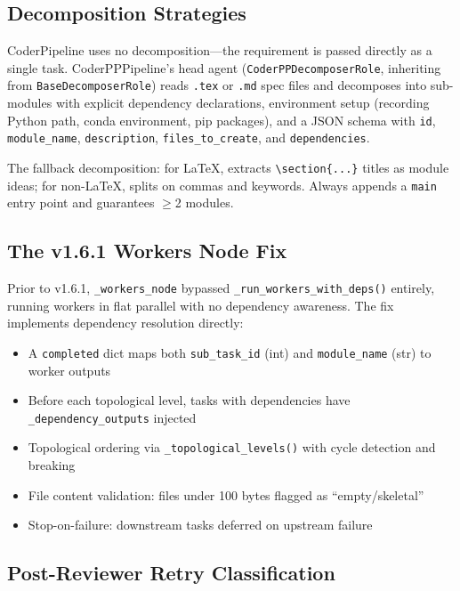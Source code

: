 \subsection{Decomposition Strategies}

CoderPipeline uses no decomposition---the requirement is passed directly as a single task. CoderPPPipeline's head agent (\texttt{CoderPPDecomposerRole}, inheriting from \texttt{BaseDecomposerRole}) reads \texttt{.tex} or \texttt{.md} spec files and decomposes into sub-modules with explicit dependency declarations, environment setup (recording Python path, conda environment, pip packages), and a JSON schema with \texttt{id}, \texttt{module\_name}, \texttt{description}, \texttt{files\_to\_create}, and \texttt{dependencies}.

The fallback decomposition: for LaTeX, extracts \texttt{\textbackslash section\{...\}} titles as module ideas; for non-LaTeX, splits on commas and keywords. Always appends a \texttt{main} entry point and guarantees $\ge$2 modules.

\subsection{The v1.6.1 Workers Node Fix}

Prior to v1.6.1, \texttt{\_workers\_node} bypassed \texttt{\_run\_workers\_with\_deps()} entirely, running workers in flat parallel with no dependency awareness. The fix implements dependency resolution directly:
\begin{itemize}
    \item A \texttt{completed} dict maps both \texttt{sub\_task\_id} (int) and \texttt{module\_name} (str) to worker outputs
    \item Before each topological level, tasks with dependencies have \texttt{\_dependency\_outputs} injected
    \item Topological ordering via \texttt{\_topological\_levels()} with cycle detection and breaking
    \item File content validation: files under 100 bytes flagged as ``empty/skeletal''
    \item Stop-on-failure: downstream tasks deferred on upstream failure
\end{itemize}

\subsection{Post-Reviewer Retry Classification}


